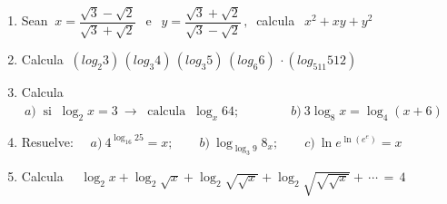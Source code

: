 \begin{enumerate}
\item Sean $\ x=\dfrac{\sqrt{3}-\sqrt{2}}{\sqrt{3}+\sqrt{2}}  \ \ \text{ e } \ \ y=\dfrac{\sqrt{3}+\sqrt{2}}{\sqrt{3}-\sqrt{2}}\, , \  $  calcula $\ \ x^2+xy+y^2$

\vspace{-6mm}
\begin{flushright}
\begin{footnotesize} \textcolor{gris}{}	\end{footnotesize}
\end{flushright}

\item Calcula $\ (log_2 3)\,(log_3 4)\,(log_3 5)\,(log_6 6)\, \cdot (log_{511} 512)$

\vspace{-6mm}
\begin{flushright}
\begin{footnotesize} \textcolor{gris}{}	\end{footnotesize}
\end{flushright}

\item Calcula $\ a)\ \text{ si } \ \log_2x=3 \ \to \ \text{ calcula }\ \log_x 64;\qquad \qquad b)\ 3\log_8 x=\log_4(x+6)$

\vspace{-6mm}
\begin{flushright}
\begin{footnotesize} \textcolor{gris}{}	\end{footnotesize}
\end{flushright}

\item Resuelve: $\quad a)\ 4^{\log_{16}{25}}=x;\qquad b)\ \log_{\log_3 9}8_x ;\qquad c)\ \ln{e^{\ln{(e^e)}}}=x$

\vspace{-6mm}
\begin{flushright}
\begin{footnotesize} \textcolor{gris}{}	\end{footnotesize}
\end{flushright}

\item Calcula $\quad \log_2 x+\log_2 \sqrt{x} + \log_2 \sqrt{\sqrt{x}}+\log_2  \sqrt{\sqrt{\sqrt{x}}} +\, \cdots \, = \, 4 $


\end{enumerate}
